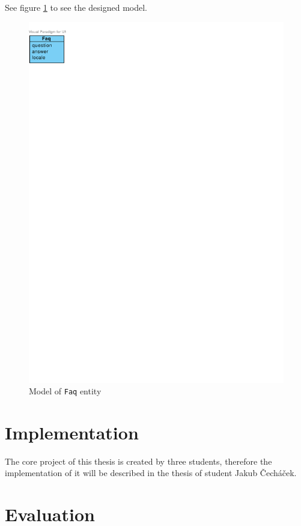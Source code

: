 See figure \ref{fig:domain-faq-entity} to see the designed model.

\begin{figure}[h]
    \centering
        \includegraphics[trim=0 740 510 30, clip, keepaspectratio]{./images/domain-faq-entity.pdf}
    \caption{Model of \texttt{Faq} entity}
    \label{fig:domain-faq-entity}
\end{figure}

\section{Implementation}

The core project of this thesis is created by three students, therefore the implementation of it will be described in the thesis of student Jakub Čecháček.

\section{Evaluation}

